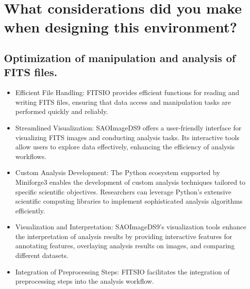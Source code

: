 \documentclass[a4paper,oneside,11pt]{book}
\begin{document}
\section{What considerations did you make when designing this environment?}
\subsection{Optimization of manipulation and analysis of FITS files.}
\begin{itemize}
    \item Efficient File Handling: FITSIO provides efficient functions for reading and writing FITS files, ensuring that data access and manipulation tasks are performed quickly and reliably.
    \item Streamlined Visualization: SAOImageDS9 offers a user-friendly interface for visualizing FITS images and conducting analysis tasks. Its interactive tools allow users to explore data effectively, enhancing the efficiency of analysis workflows.
    \item Custom Analysis Development: The Python ecosystem supported by Miniforge3 enables the development of custom analysis techniques tailored to specific scientific objectives. Researchers can leverage Python's extensive scientific computing libraries to implement sophisticated analysis algorithms efficiently.
    \item Visualization and Interpretation: SAOImageDS9's visualization tools enhance the interpretation of analysis results by providing interactive features for annotating features, overlaying analysis results on images, and comparing different datasets. 
    \item Integration of Preprocessing Steps: FITSIO facilitates the integration of preprocessing steps into the analysis workflow.
\end{itemize}
\end{document}
